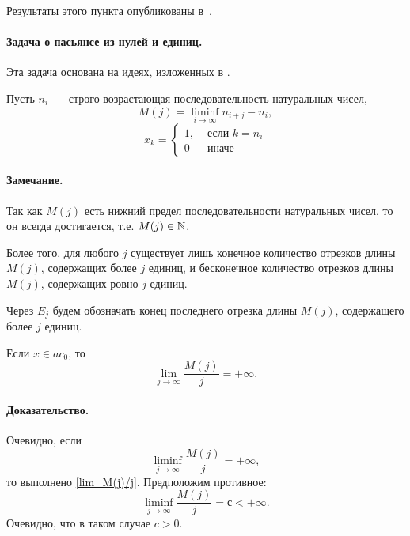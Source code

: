 Результаты этого пункта опубликованы в~\cite{our-mz2019ac0}.

\paragraph{Задача о пасьянсе из нулей и единиц.}

Эта задача основана на идеях, изложенных в \cite[\S 5]{Semenov2014geomprops}.

Пусть $n_i$~--- строго возрастающая последовательность натуральных чисел,
\begin{equation}
	\label{eq:definition_M_j}
	M(j) = \liminf_{i\to\infty} n_{i+j} - n_i,
\end{equation}
\begin{equation}
	x_k = \left\{\begin{array}{ll}
		1, & \mbox{~если~} k = n_i
		\\
		0  & \mbox{~иначе~}
	\end{array}\right.
\end{equation}

\paragraph{Замечание.}
Так как $M(j)$ есть нижний предел последовательности натуральных чисел,
то он всегда достигается,
т.е. $M(j)\in\mathbb{N}$.

Более того, для любого $j$ существует лишь конечное количество отрезков длины $M(j)$,
содержащих более $j$ единиц,
и бесконечное количество отрезков длины $M(j)$,
содержащих ровно $j$ единиц.

Через $E_j$ будем обозначать конец последнего отрезка длины $M(j)$,
содержащего более $j$ единиц.

\begin{lemma}
	\label{thm:lim_M(j)/j_neobh}
	Если $x \in ac_0$, то
	\begin{equation}\label{lim_M(j)/j}
		\lim_{j \to \infty} \frac{M(j)}{j} = +\infty
		.
	\end{equation}
\end{lemma}

\paragraph{Доказательство.}
Очевидно, если
\begin{equation}
	\liminf_{j \to \infty} \frac{M(j)}{j} = +\infty
	,
\end{equation}
то выполнено \eqref{lim_M(j)/j}.
Предположим противное:
\begin{equation}
	\liminf_{j \to \infty} \frac{M(j)}{j} = с < +\infty
	.
\end{equation}
Очевидно, что в таком случае $c>0$.

